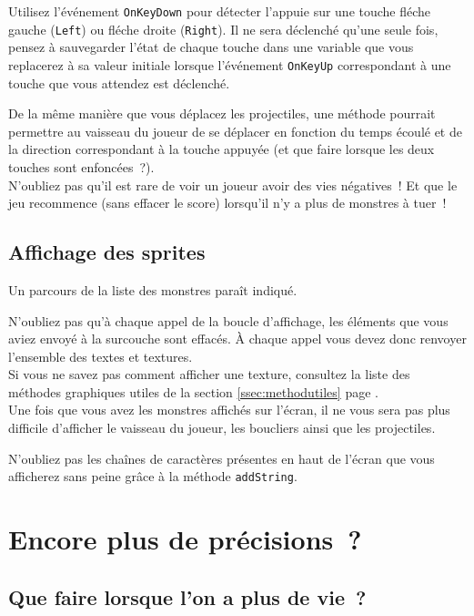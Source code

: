 Utilisez l'événement \texttt{OnKeyDown} pour détecter l'appuie sur une touche fléche gauche (\texttt{Left}) ou fléche droite (\texttt{Right}). Il ne sera déclenché qu'une seule fois, pensez à sauvegarder l'état de chaque touche dans une variable que vous replacerez à sa valeur initiale lorsque l'événement \texttt{OnKeyUp} correspondant à une touche que vous attendez est déclenché.

De la même manière que vous déplacez les projectiles, une méthode pourrait permettre au vaisseau du joueur de se déplacer en fonction du temps écoulé et de la direction correspondant à la touche appuyée (et que faire lorsque les deux touches sont enfoncées~?).\\

N'oubliez pas qu'il est rare de voir un joueur avoir des vies négatives~! Et que le jeu recommence (sans effacer le score) lorsqu'il n'y a plus de monstres à tuer~!

\subsection{Affichage des sprites}

Un parcours de la liste des monstres paraît indiqué.

N'oubliez pas qu'à chaque appel de la boucle d'affichage, les éléments que vous aviez envoyé à la surcouche sont effacés. À chaque appel vous devez donc renvoyer l'ensemble des textes et textures.\\

Si vous ne savez pas comment afficher une texture, consultez la liste des méthodes graphiques utiles de la section \ref{ssec:methodutiles} page \pageref{ssec:methodutiles}.\\

Une fois que vous avez les monstres affichés sur l'écran, il ne vous sera pas plus difficile d'afficher le vaisseau du joueur, les boucliers ainsi que les projectiles.

N'oubliez pas les chaînes de caractères présentes en haut de l'écran que vous afficherez sans peine grâce à la méthode \texttt{addString}.


\section{Encore plus de précisions~?}

\subsection{Que faire lorsque l'on a plus de vie~?}

